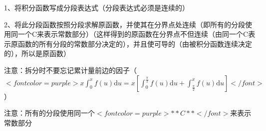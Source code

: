 1、将积分函数写成分段表达式（分段表达式必须是连续的）

2、将此分段函数按照分段求解原函数，并使其在分界点处连续（即所有的分段使用同一个C来表示常数部分）（这样得到的原函数在分界点不但连续（由同一个C表示原函数的所有分段的常数部分决定的），并且使可导的（由被积分函数连续决定的），所以是原函数）

注意：拆分时不要忘记累计量前边的因子（$ <font color=purple>x \int_{0}^{x} f(u) \mathrm{d} u=x\left[\int_{0}^{\frac{\pi}{2}} f(u) \mathrm{d} u+\int_{\frac{\pi}{2}}^{x} f(u) \mathrm{d} u\right]</font> $）

注意：所有的分段使用同一个$ <font color=purple>**C**</font> $来表示常数部分

